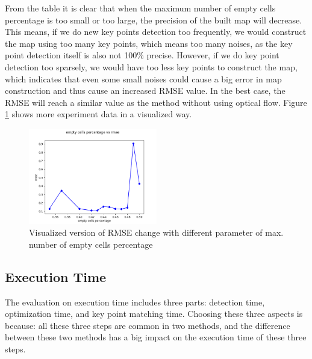 \documentclass[conference]{IEEEtran}
\begin{document}
From the table it is clear that when the maximum number of empty cells percentage is too small or too large, the precision of the built map will decrease. This means, if we do new key points detection too frequently, we would construct the map using too many key points, which means too many noises, as the key point detection itself is also not 100\% precise. However, if we do key point detection too sparsely, we would have too less key points to construct the map, which indicates that even some small noises could cause a big error in map construction and thus cause an increased RMSE value. In the best case, the RMSE will reach a similar value as the method without using optical flow. Figure \ref{fig:max_empty_cell} shows more experiment data in a visualized way.

\begin{figure}
	\label{fig:max_empty_cell}
	\centering
	\includegraphics[width=0.5\textwidth]{img/max_num_empty_cell1.png}
	\caption{Visualized version of RMSE change with different parameter of max. number of empty cells percentage}
\end{figure}


\subsection{Execution Time}
The evaluation on execution time includes three parts: detection time, optimization time, and key point matching time. Choosing these three aspects is because: all these three steps are common in two methods, and the difference between these two methods has a big impact on the execution time of these three steps.

\end{document}
